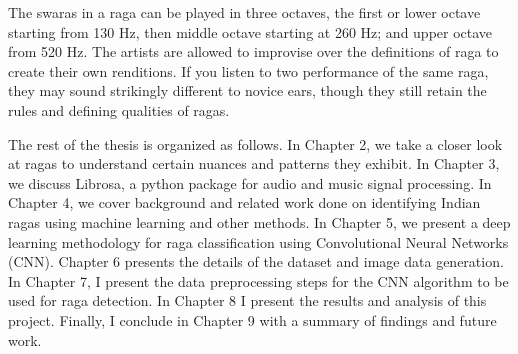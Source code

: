 The swaras in a raga can be played in three octaves, the first or lower octave starting from 130 Hz, then middle octave starting at 260 Hz; and upper octave from 520 Hz. The artists are allowed to improvise over the definitions of raga to create their own renditions. If you listen to two performance of the same raga, they may sound strikingly different to novice ears, though they still retain the rules and defining qualities of ragas. \par

The rest of the thesis is organized as follows. In Chapter 2, we take a closer look at ragas to understand certain nuances and patterns they exhibit. In Chapter 3, we discuss Librosa, a python package for audio and music signal processing. In Chapter 4, we cover background and related work done on identifying Indian ragas using machine learning and other methods. In Chapter 5, we present a deep learning methodology for raga classification using Convolutional Neural Networks (CNN). Chapter 6 presents the details of the dataset and image data generation. In Chapter 7, I present the data preprocessing steps for the CNN algorithm to be used for raga detection. In Chapter 8 I present the results and analysis of this project. Finally, I conclude in Chapter 9 with a summary of findings and future work.  
